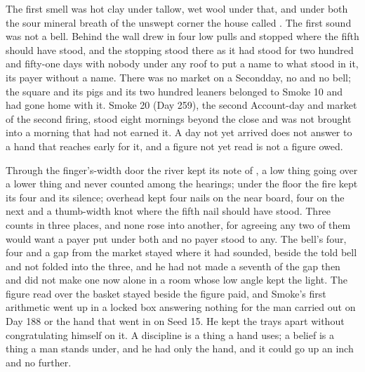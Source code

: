 The first smell was hot clay under tallow, wet wool under that, and under both the sour mineral breath of the unswept corner the house called . The first sound was not a bell. Behind the wall  drew in four low pulls and stopped where the fifth should have stood, and the stopping stood there as it had stood for two hundred and fifty-one days with nobody under any roof to put a name to what stood in it, its payer without a name. There was no market on a Secondday, no  and no bell; the square and its pigs and its two hundred leaners belonged to Smoke 10 and had gone home with it. Smoke 20 (Day 259), the second Account-day and market of the second firing, stood eight mornings beyond the close and was not brought into a morning that had not earned it. A day not yet arrived does not answer to a hand that reaches early for it, and a figure not yet read is not a figure owed.

Through the finger's-width door the river kept its note of , a low thing going over a lower thing and never counted among the hearings; under the floor the fire kept its four and its silence; overhead  kept four nails on the near board, four on the next and a thumb-width knot where the fifth nail should have stood. Three counts in three places, and none rose into another, for agreeing any two of them would want a payer put under both and no payer stood to any. The bell's four, four and a gap from the market stayed where it had sounded, beside the told bell and not folded into the three, and he had not made a seventh of the gap then and did not make one now alone in a room whose low angle kept the light. The figure read over the basket stayed beside the figure paid, and Smoke's first arithmetic went up  in a locked box answering nothing for the man carried out on Day 188 or the hand that went in on Seed 15. He kept the trays apart without congratulating himself on it. A discipline is a thing a hand uses; a belief is a thing a man stands under, and he had only the hand, and it could go up an inch and no further.

